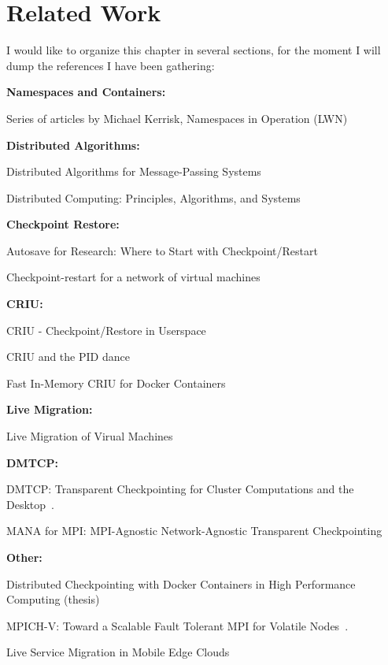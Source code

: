 \chapter{Related Work} \label{chap:related-work}

I would like to organize this chapter in several sections, for the moment I will dump the references I have been gathering:

\textbf{Namespaces and Containers:}

Series of articles by Michael Kerrisk, Namespaces in Operation (LWN)~\cite{Kerrisk2013}

\textbf{Distributed Algorithms:}

Distributed Algorithms for Message-Passing Systems~\cite{Raynal2013}

Distributed Computing: Principles, Algorithms, and Systems~\cite{Kshemkalyani2008}

\textbf{Checkpoint Restore:}

Autosave for Research: Where to Start with Checkpoint/Restart~\cite{Barker2014}

Checkpoint-restart for a network of virtual machines~\cite{Garg2013}

\textbf{CRIU:}

CRIU - Checkpoint/Restore in Userspace~\cite{Reber2016}

CRIU and the PID dance~\cite{Reber2019}

Fast In-Memory CRIU for Docker Containers~\cite{Venkatesh2019}

\textbf{Live Migration:}

Live Migration of Virual Machines~\cite{Clark2005}

\textbf{DMTCP:}

DMTCP: Transparent Checkpointing for Cluster Computations and the Desktop~\cite{Ansel2009}.

MANA for MPI: MPI-Agnostic Network-Agnostic Transparent Checkpointing~\cite{Garg2019}

\textbf{Other:}

Distributed Checkpointing with Docker Containers in High Performance Computing (thesis)~\cite{Berg2017}

MPICH-V: Toward a Scalable Fault Tolerant MPI for Volatile Nodes~\cite{Bosilca2002}.

Live Service Migration in Mobile Edge Clouds~\cite{Machen2018}
